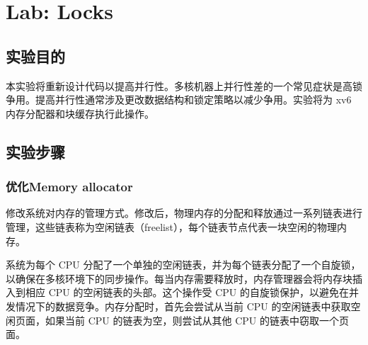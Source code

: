 \section{Lab: Locks}

\subsection{实验目的}
本实验将重新设计代码以提高并行性。多核机器上并行性差的一个常见症状是高锁争用。提高并行性通常涉及更改数据结构和锁定策略以减少争用。实验将为 xv6 内存分配器和块缓存执行此操作。

\subsection{实验步骤}

\subsubsection{优化Memory allocator}

修改系统对内存的管理方式。修改后，物理内存的分配和释放通过一系列链表进行管理，这些链表称为空闲链表（freelist），每个链表节点代表一块空闲的物理内存。

系统为每个 CPU 分配了一个单独的空闲链表，并为每个链表分配了一个自旋锁，以确保在多核环境下的同步操作。每当内存需要释放时，内存管理器会将内存块插入到相应 CPU 的空闲链表的头部。这个操作受 CPU 的自旋锁保护，以避免在并发情况下的数据竞争。内存分配时，首先会尝试从当前 CPU 的空闲链表中获取空闲页面，如果当前 CPU 的链表为空，则尝试从其他 CPU 的链表中窃取一个页面。

